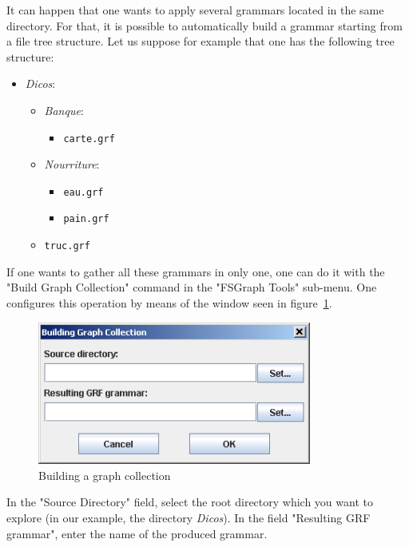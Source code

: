 It can happen that one wants to apply several grammars located in the same directory. For
that, it is possible to automatically build a grammar starting from a file tree
structure. Let us suppose for example that one has the following tree structure:

\begin{itemize}
  \item \textit{Dicos}:
  \begin{itemize}
    \item \textit{Banque}:
    \begin{itemize}
      \item \texttt{carte.grf}
    \end{itemize}
    \item \textit{Nourriture}:
    \begin{itemize}
      \item \texttt{eau.grf}
      \item \texttt{pain.grf}
    \end{itemize}
    \item \texttt{truc.grf}
  \end{itemize}
\end{itemize}

\noindent If one wants to gather all these grammars in only one, one can do it
with the "Build Graph Collection" command in the "FSGraph Tools" sub-menu. One configures
this operation by means of the window seen in
figure~\ref{fig-build-graph-collection}.

\begin{figure}[!h]
\begin{center}
\includegraphics[width=9cm]{resources/img/fig6-20.png}
\caption{Building a graph collection\label{fig-build-graph-collection}}
\end{center}
\end{figure}

\noindent In the "Source Directory" field, select the root directory which you
want to explore (in our example, the directory \textit{Dicos}). In the field "Resulting
GRF grammar", enter the name of the produced grammar.


